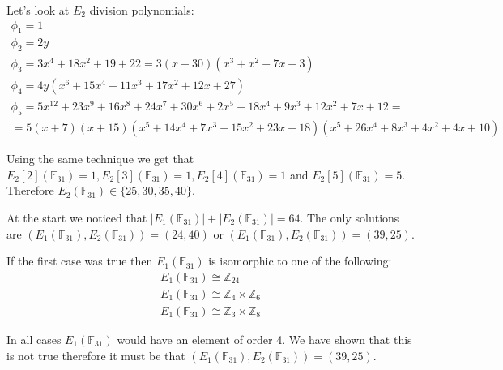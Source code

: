 \documentclass[12pt, a4paper]{article}
\begin{document}
Let's look at $E_2$ division polynomials:
\begin{gather*}
\phi_1= 1\\
\phi_2 = 2y\\
\phi_3 = 3x^4+18x^2+19+22 = 3(x+30)(x^3+x^2+7x+3)\\
\phi_4 = 4y(x^6+15x^4+11x^3+17x^2+12x+27)\\
\phi_5 = 5x^{12}+23x^9+16x^8+24x^7+30x^6+2x^5+18x^4+9x^3+12x^2+7x+12 = \\
=5(x+7)(x+15)(x^5+14x^4+7x^3+15x^2+23x+18)(x^5+26x^4+8x^3+4x^2+4x+10)
\end{gather*}

Using the same technique we get that $E_2[2](\mathbb{F}_{31})=1, E_2[3](\mathbb{F}_{31})=1, E_2[4](\mathbb{F}_{31})=1$ and $E_2[5](\mathbb{F}_{31})=5$. Therefore $E_2(\mathbb{F}_{31}) \in \{25, 30, 35, 40\} $.

At the start we noticed that $|E_1(\mathbb{F}_{31})|+|E_2(\mathbb{F}_{31})|=64$. The only solutions are $(E_1(\mathbb{F}_{31}), E_2(\mathbb{F}_{31})) = (24, 40)$ or $(E_1(\mathbb{F}_{31}), E_2(\mathbb{F}_{31})) = (39, 25)$.

If the first case was true then $E_1(\mathbb{F}_{31})$ is isomorphic to one of the following:
\begin{gather*}
E_1(\mathbb{F}_{31}) \cong \mathbb{Z}_{24}\\
E_1(\mathbb{F}_{31}) \cong \mathbb{Z}_4 \times \mathbb{Z}_6\\
E_1(\mathbb{F}_{31}) \cong \mathbb{Z}_3 \times \mathbb{Z}_8
\end{gather*}

In all cases $E_1(\mathbb{F}_{31})$ would have an element of order 4. We have shown that this is not true therefore it must be that $(E_1(\mathbb{F}_{31}), E_2(\mathbb{F}_{31})) = (39, 25)$.
\end{document}
